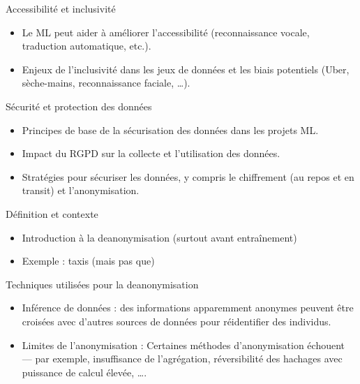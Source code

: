 \begin{frame}{Accessibilité et inclusivité}
  \begin{itemize}
  \item Le ML peut aider à améliorer l'accessibilité (reconnaissance
    vocale, traduction automatique, etc.).
  \item Enjeux de l'inclusivité dans les jeux de données et les biais
    potentiels (Uber, sèche-mains, reconnaissance faciale, \dots).
  \end{itemize}
\end{frame}

\begin{frame}{Sécurité et protection des données}
  \begin{itemize}
  \item Principes de base de la sécurisation des données dans les
    projets ML.
  \item Impact du RGPD sur la collecte et l'utilisation des données.
  \item Stratégies pour sécuriser les données, y compris le
    chiffrement (au repos et en transit) et l'anonymisation.
  \end{itemize}
\end{frame}

\begin{frame}{Définition et contexte}
  \begin{itemize}
  \item {Introduction à la deanonymisation} (surtout avant entraînement)
  \item {Exemple} : taxis (mais pas que)
  \end{itemize}
\end{frame}

\begin{frame}{Techniques utilisées pour la deanonymisation}
  \begin{itemize}
  \item {Inférence de données} : des
    informations apparemment anonymes peuvent être croisées avec
    d'autres sources de données pour réidentifier des individus.
  \item {Limites de l'anonymisation} : Certaines méthodes
    d'anonymisation échouent --- par exemple, insuffisance de
    l'agrégation, réversibilité des hachages avec puissance de calcul
    élevée, \dots.
  \end{itemize}
\end{frame}


